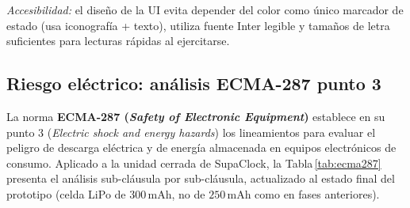 \documentclass[letterpaper,11pt]{article}
\newcommand{\rtabla}[1]{Tabla\,\ref{#1}}
\newcommand{\NombreProyecto}{SupaClock}
\begin{document}
\emph{Accesibilidad:} el dise\~no de la UI evita depender del color como \'unico marcador de estado (usa iconograf\'ia + texto), utiliza fuente Inter \cite{inter_font} legible y tama\~nos de letra suficientes para lecturas r\'apidas al ejercitarse.

\subsection{Riesgo el\'ectrico: an\'alisis ECMA-287 punto 3}\label{sec:ecma}

La norma \textbf{ECMA-287 (\textit{Safety of Electronic Equipment})} \cite{ecma287} establece en su punto 3 (\textit{Electric shock and energy hazards}) los lineamientos para evaluar el peligro de descarga el\'ectrica y de energ\'ia almacenada en equipos electr\'onicos de consumo. Aplicado a la unidad cerrada de \NombreProyecto, la \rtabla{tab:ecma287} presenta el an\'alisis sub-cl\'ausula por sub-cl\'ausula, actualizado al estado final del prototipo (celda LiPo de $300$\,mAh, no de $250$\,mAh como en fases anteriores).
\end{document}
